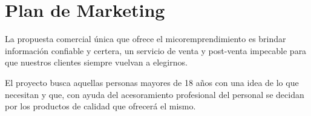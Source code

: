 \documentclass[11pt,a4paper]{article}
\begin{document}
\section{Plan de Marketing}

La propuesta comercial única que ofrece el micoremprendimiento es brindar información confiable y certera, un servicio de venta y post-venta impecable para que nuestros clientes siempre vuelvan a elegirnos.

El proyecto busca aquellas personas mayores de 18 años con una idea de lo que necesitan y que, con ayuda del acesoramiento profesional del personal se decidan por los productos de calidad que ofrecerá el mismo. 









\end{document}
